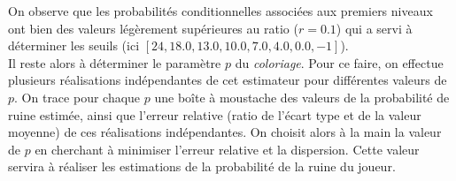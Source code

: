 \documentclass[a4paper,11pt]{article}
\begin{document}
On observe que les probabilités conditionnelles associées aux premiers niveaux ont bien des valeurs légèrement supérieures au ratio ($r=0.1$) qui a servi à déterminer les seuils (ici $[24, 18.0, 13.0, 10.0, 7.0, 4.0, 0.0, -1]
$).\\

Il reste alors à déterminer le paramètre $p$ du \textit{coloriage}. Pour ce faire, on effectue plusieurs réalisations indépendantes de cet estimateur pour différentes valeurs de $p$. On trace pour chaque $p$ une boîte à moustache des valeurs de la probabilité de ruine estimée, ainsi que l'erreur relative (ratio de l'écart type et de la valeur moyenne) de ces réalisations indépendantes. On choisit alors à la main la valeur de $p$ en cherchant à minimiser l'erreur relative et la dispersion. Cette valeur servira à réaliser les estimations de la probabilité de la ruine du joueur.\\
\end{document}

